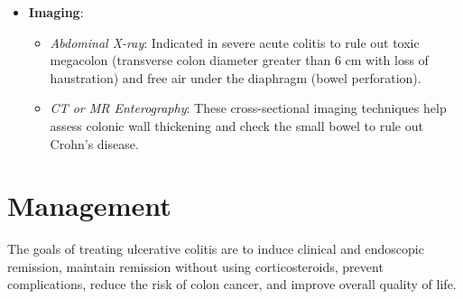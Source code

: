 \begin{itemize}
\begin{itemize}
  \end{itemize}
  \item \textbf{Imaging}:
  \begin{itemize}
    \item \textit{Abdominal X-ray}: Indicated in severe acute colitis to rule out toxic megacolon (transverse colon diameter greater than 6 cm with loss of haustration) and free air under the diaphragm (bowel perforation).
    \item \textit{CT or MR Enterography}: These cross-sectional imaging techniques help assess colonic wall thickening and check the small bowel to rule out Crohn's disease.
  \end{itemize}
\end{itemize}

\section*{Management}
The goals of treating ulcerative colitis are to induce clinical and endoscopic remission, maintain remission without using corticosteroids, prevent complications, reduce the risk of colon cancer, and improve overall quality of life.

